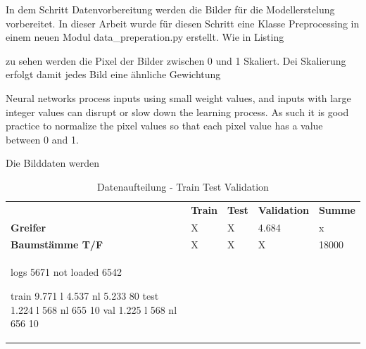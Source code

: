 			In dem Schritt Datenvorbereitung werden die Bilder für die Modellerstelung vorbereitet. In dieser Arbeit wurde für diesen Schritt eine Klasse Preprocessing in einem neuen Modul data\_preperation.py  erstellt. Wie in Listing 
			
			 zu sehen werden die Pixel der Bilder zwischen 0 und 1 Skaliert. Dei Skalierung erfolgt damit jedes Bild eine ähnliche Gewichtung
			
			Neural networks process inputs using small weight values, and inputs with large integer values can disrupt or slow down the learning process. As such it is good practice to normalize the pixel values so that each pixel value has a value between 0 and 1.
			
			Die Bilddaten werden 		
			

 

	\begin{table}[ht]
	\centering
	\begin{tabularx}{\textwidth}{lllll}
		 & \textbf{Train} & \textbf{Test}  & \textbf{Validation} & \textbf{Summe} 								  \\
		\textbf{Greifer} 				 & 	X					&	X					& 4.684 				   & x 				\\
		\textbf{Baumstämme T/F}	 	  &  X					 &	X					 &	X							& 18000		\\
		
		
		logs 5671
		not loaded 6542 
		 
		train 9.771 l 4.537  nl 5.233 80
		test 1.224 l  568 nl 655  10
		val  1.225 l 568 nl 656  10
		
	\end{tabularx}
	\caption{Datenaufteilung - Train Test Validation}
	\label{table:DatenaufteilungTrainTestValidation}
 	\end{table}
 

